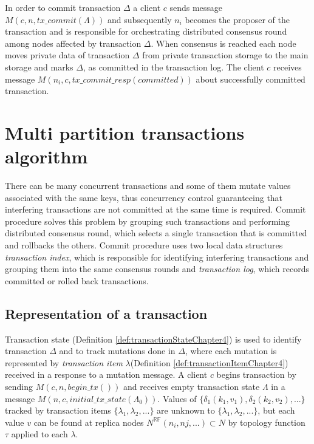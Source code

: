 \documentclass[runningheads,a4paper]{llncs}
\newcommand{\transaction}{$\Delta$\xspace}
\newcommand{\beginTransactionMessage}{$\mathit{M}(c, n, \mathit{begin\_tx}())$\xspace}
\newcommand{\initialTxStateMessage}{$\mathit{M}(n, c, \mathit{initial\_tx\_state}(\Lambda_{0}))$\xspace}
\newcommand{\txCommitMessage}{$\mathit{M}(c,n, \mathit{tx\_commit}(\Lambda))$\xspace}
\newcommand{\txCommitResonseMessage}{$\mathit{M}(n_{i},c,\mathit{tx\_commit\_resp}(committed))$\xspace}
\newcommand{\topology}{$\tau$\xspace}
\newcommand{\mutationsFull}{$\{\delta_{1}(k_1, v_1), \delta_{2}(k_2, v_2), ...\}$\xspace}
\newcommand{\txItem}{$\lambda$\xspace}
\newcommand{\txItems}{$\{\lambda_{1}, \lambda_{2}, ...\}$\xspace}
\newcommand{\txState}{$\Lambda$\xspace}
\newcommand{\client}{$c$\xspace}
\newcommand{\node}[1]{$n_{#1}$\xspace}
\begin{document}
In order to commit transaction \transaction a client \client sends message \txCommitMessage and subsequently \node{i} becomes the proposer of the transaction and is responsible for orchestrating distributed consensus round among nodes affected by transaction \transaction. %
When consensus is reached each node moves private data of transaction \transaction from private transaction storage to the main storage and marks \transaction, as committed in the transaction log. The client \client receives message \txCommitResonseMessage about successfully committed transaction.

\section{Multi partition transactions algorithm}

There can be many concurrent transactions and some of them mutate values associated with the same keys, thus concurrency control guaranteeing that interfering transactions are not committed at the same time is required. Commit procedure solves this problem by grouping such transactions and performing distributed consensus round, which selects a single transaction that is committed and rollbacks the others. Commit procedure uses two local data structures \emph{transaction index}, which is responsible for identifying interfering transactions and grouping them into the same consensus rounds and \emph{transaction log}, which records committed or rolled back transactions.

\subsection{Representation of a transaction}

Transaction state (Definition \ref{def:transactionStateChapter4}) is used to identify transaction \transaction and to track mutations done in \transaction, where each mutation is represented by \emph{transaction item} \txItem (Definition \ref{def:transactionItemChapter4}) received in a response to a mutation message. A client \client begins transaction by sending \beginTransactionMessage and receives empty transaction state \txState in a message  \initialTxStateMessage. Values of \mutationsFull tracked by transaction items \txItems are unknown to \txItems, but each value $v$ can be found at replica nodes $N^{\mathbb{RF}}(n_{i},n{j},...)\subset \mathit{N}$ by topology function \topology applied to each \txItem.
\end{document}
